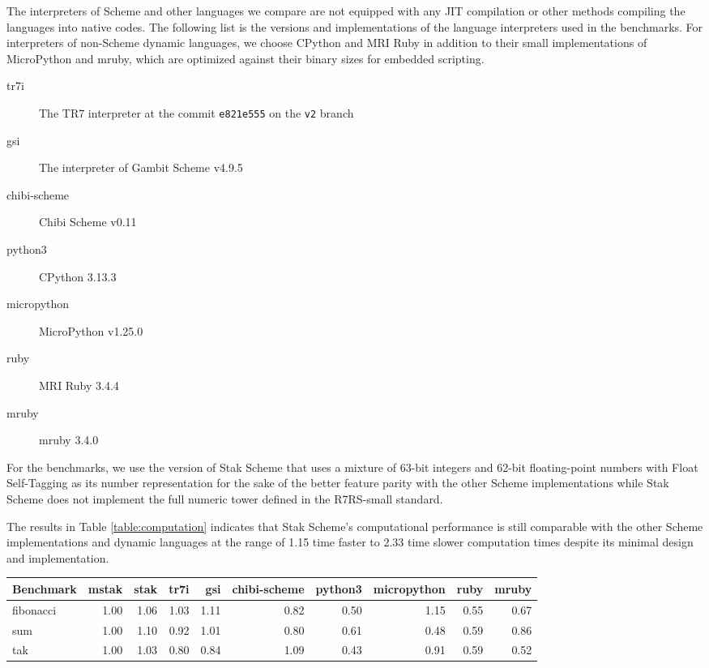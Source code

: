 \documentclass[sigplan, anonymous, review]{acmart}
\begin{document}
The interpreters of Scheme and other languages we compare are not equipped with
any JIT compilation or other methods compiling the languages into
native codes.
The following list is the versions and implementations of
the language interpreters used in the benchmarks.
For interpreters of non-Scheme dynamic languages, we choose CPython and
MRI Ruby in addition to their small implementations of MicroPython
and mruby, which are optimized against their binary sizes for
embedded scripting.

\begin{description}
  \item[tr7i] The TR7 interpreter at the commit \texttt{e821e555}
    on the \texttt{v2} branch
  \item[gsi] The interpreter of Gambit Scheme v4.9.5
  \item[chibi-scheme] Chibi Scheme v0.11
  \item[python3] CPython 3.13.3
  \item[micropython] MicroPython v1.25.0
  \item[ruby] MRI Ruby 3.4.4
  \item[mruby] mruby 3.4.0
\end{description}

For the benchmarks, we use the version of Stak Scheme that uses a
mixture of 63-bit integers and 62-bit floating-point numbers with Float
Self-Tagging \cite{floatselftag} as its number representation
for the sake of the better feature parity with
the other Scheme implementations while Stak Scheme does not implement
the full numeric tower defined in the R7RS-small standard.

The results in Table \ref{table:computation} indicates that Stak
Scheme's computational performance is still comparable with the other
Scheme implementations and dynamic languages at the range of 1.15
time faster to 2.33 time slower computation times
despite its minimal design and implementation.

\begin{table*}
  \begin{center}
    \caption{Computational benchmarks (relative time. lower is better.)}
    \label{table:computation}
    \begin{tabular}{l|rrrrrrrrr}
      \hline
      Benchmark & mstak & stak & tr7i & gsi & chibi-scheme & python3
      & micropython & ruby & mruby \\
      \hline
      fibonacci & 1.00 & 1.06 & 1.03 & 1.11 & 0.82 & 0.50 & 1.15 &
      0.55 & 0.67 \\
      sum & 1.00 & 1.10 & 0.92 & 1.01 & 0.80 & 0.61 & 0.48 & 0.59 & 0.86 \\
      tak & 1.00 & 1.03 & 0.80 & 0.84 & 1.09 & 0.43 & 0.91 & 0.59 & 0.52 \\
      \hline
    \end{tabular}
  \end{center}
\end{table*}
\end{document}

